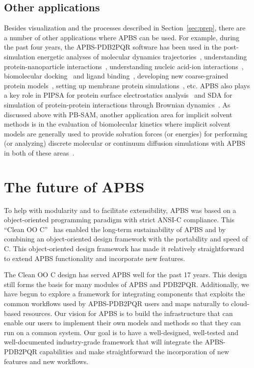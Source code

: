 \documentclass[12pt,titlepage]{article}
\begin{document}
\subsection{Other applications}
Besides visualization and the processes described in Section~\ref{sec:prep}, there are a number of other applications where APBS can be used.
For example, during the past four years, the APBS-PDB2PQR software has been used in the post-simulation energetic analyses of molecular dynamics trajectories~\cite{Dror2013}, understanding protein-nanoparticle interactions~\cite{Treuel2013, DePaoli2014}, understanding nucleic acid-ion interactions~\cite{Lipfert2014}, biomolecular docking~\cite{Roberts2013} and ligand binding~\cite{Evangelidis2009}, developing new coarse-grained protein models~\cite{Spiga2013}, setting up membrane protein simulations~\cite{Stansfeld2015}, etc.
APBS also plays a key role in PIPSA for protein surface electrostatics analysis~\cite{Richter2008} and SDA for simulation of protein-protein interactions through Brownian dynamics~\cite{Martinez2015}.
As discussed above with PB-SAM, another application area for implicit solvent methods is in the evaluation of biomolecular kinetics where implicit solvent models are generally used to provide solvation forces (or energies) for performing (or analyzing) discrete molecular or continuum diffusion simulations with APBS in both of these areas~\cite{Dror2013, Martinez2015, Cheng2007, Cheng2007a, Song2004a, Song2004a, Elcock2004, Mereghetti2012}.

\section{The future of APBS}
To help with modularity and to facilitate extensibility, APBS was based on a object-oriented programming paradigm with strict ANSI-C compliance.
This ``Clean OO C''~\cite{CleanOOC} has enabled the long-term sustainability of APBS and by combining an object-oriented design framework with the portability and speed of C.
This object-oriented design framework has made it relatively straightforward to extend APBS functionality and incorporate new features.

The Clean OO C design has served APBS well for the past 17 years.
This design still forms the basis for many modules of APBS and PDB2PQR.
Additionally, we have begun to explore a framework for integrating components that exploits the common workflows used by APBS-PDB2PQR users and maps naturally to cloud-based resources.
Our vision for APBS is to build the infrastructure that can enable our users to implement their own models and methods so that they can run on a common system.
Our goal is to have a well-designed, well-tested and well-documented industry-grade framework that will integrate the APBS-PDB2PQR capabilities and make straightforward the incorporation of new features and new workflows.
\end{document}
